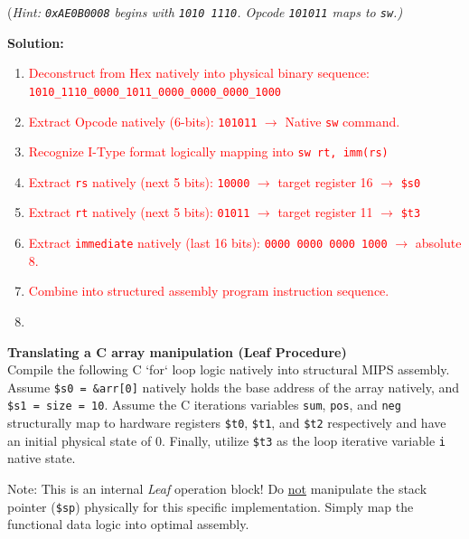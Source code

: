 \documentclass[letterpaper]{report}
\begin{document}
\begin{enumerate}[(a)]
    (\textit{Hint: \texttt{0xAE0B0008} begins with \texttt{1010 1110}. Opcode \texttt{101011} maps to \texttt{sw}.)}
    
    {\color{red} \textbf{Solution:}}
    \begin{enumerate}
        \item \textcolor{red}{Deconstruct from Hex natively into physical binary sequence: \texttt{1010\_1110\_0000\_1011\_0000\_0000\_0000\_1000}}
        \item \textcolor{red}{Extract Opcode natively (6-bits): \texttt{101011} $\rightarrow$ Native \texttt{sw} command.}
        \item \textcolor{red}{Recognize I-Type format logically mapping into \texttt{sw rt, imm(rs)}}
        \item \textcolor{red}{Extract \texttt{rs} natively (next 5 bits): \texttt{10000} $\rightarrow$ target register 16 $\rightarrow$ \texttt{\$s0}}
        \item \textcolor{red}{Extract \texttt{rt} natively (next 5 bits): \texttt{01011} $\rightarrow$ target register 11 $\rightarrow$ \texttt{\$t3}}
        \item \textcolor{red}{Extract \texttt{immediate} natively (last 16 bits): \texttt{0000 0000 0000 1000} $\rightarrow$ absolute 8.}
        \item \textcolor{red}{Combine into structured assembly program instruction sequence.}
        \item {}
    \end{enumerate}
\end{enumerate}
\ep
\vf
\newpage

%
 {\bf Translating a C array manipulation (Leaf Procedure)} \\
Compile the following C `for` loop logic natively into structural MIPS assembly. Assume \texttt{\$s0 = \&arr[0]} natively holds the base address of the array natively, and \texttt{\$s1 = size = 10}. Assume the C iterations variables \texttt{sum}, \texttt{pos}, and \texttt{neg} structurally map to hardware registers \texttt{\$t0}, \texttt{\$t1}, and \texttt{\$t2} respectively and have an initial physical state of $0$. Finally, utilize \texttt{\$t3} as the loop iterative variable \texttt{i} native state.

Note: This is an internal \textit{Leaf} operation block! Do \underline{not} manipulate the stack pointer (\texttt{\$sp}) physically for this specific implementation. Simply map the functional data logic into optimal assembly.
\end{document}
